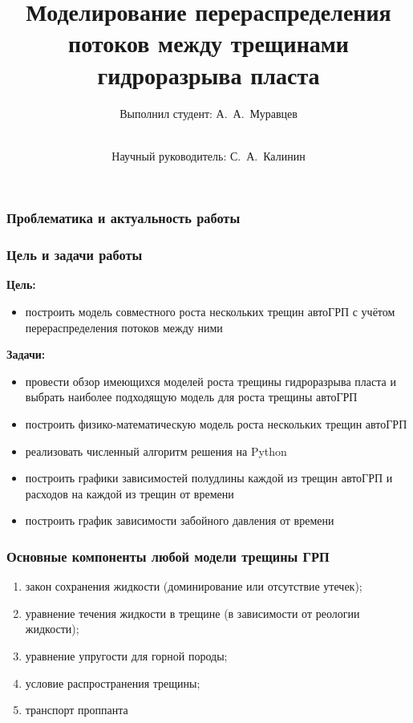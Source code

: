 \documentclass{beamer}
\title{Моделирование перераспределения потоков между трещинами гидроразрыва пласта}
\subtitle{}
\author{Выполнил студент: А.~А.~Муравцев\and \\Научный руководитель: С.~А.~Калинин}
\begin{document}
\begin{frame}
\titlepage
\end{frame}


\begin{frame}
\frametitle{Проблематика и актуальность работы}
\end{frame}


\begin{frame}
\frametitle{Цель и задачи работы}

\textbf{Цель:}
\begin{itemize}
	\item построить модель совместного роста нескольких трещин автоГРП с учётом перераспределения потоков между ними
\end{itemize}

\textbf{Задачи:}
\begin{itemize}
	\item провести обзор имеющихся моделей роста трещины гидроразрыва пласта и выбрать наиболее подходящую модель для роста трещины автоГРП
	\item построить физико-математическую модель роста нескольких трещин автоГРП
	\item реализовать численный алгоритм решения на Python
	\item построить графики зависимостей полудлины каждой из трещин автоГРП и расходов на каждой из трещин от времени
	\item построить график зависимости забойного давления от времени
\end{itemize}

\end{frame}


\begin{frame}
\frametitle{Основные компоненты любой модели трещины ГРП}

\begin{enumerate}[1)]
	\item закон сохранения жидкости (доминирование или отсутствие утечек);
	\item уравнение течения жидкости в трещине (в зависимости от реологии жидкости);
	\item уравнение упругости для горной породы;
	\item условие распространения трещины;
	\item транспорт проппанта
\end{enumerate}

\end{frame}
\end{document}

